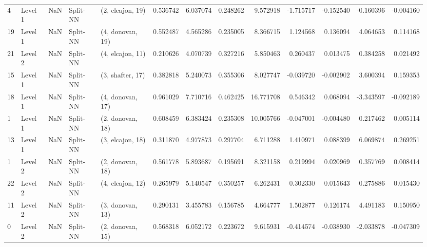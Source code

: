 \begin{tabular}{llrllrrrrrrrr}
4  &   Level 1 &    NaN &       Split-NN &  (2, elcajon, 19) &   0.536742 &   6.037074 &  0.248262 &   9.572918 &            -1.715717 &              -0.152540 &           -0.160396 &             -0.004160 \\
19 &   Level 1 &    NaN &       Split-NN &  (4, donovan, 19) &   0.552487 &   4.565286 &  0.235005 &   8.366715 &             1.124568 &               0.136094 &            4.064653 &              0.114168 \\
21 &   Level 2 &    NaN &       Split-NN &  (4, elcajon, 11) &   0.210626 &   4.070739 &  0.327216 &   5.850463 &             0.260437 &               0.013475 &            0.384258 &              0.021492 \\
15 &   Level 1 &    NaN &       Split-NN &  (3, shafter, 17) &   0.382818 &   5.240073 &  0.355306 &   8.027747 &            -0.039720 &              -0.002902 &            3.600394 &              0.159353 \\
18 &   Level 1 &    NaN &       Split-NN &  (4, donovan, 17) &   0.961029 &   7.710716 &  0.462425 &  16.771708 &             0.546342 &               0.068094 &           -3.343597 &             -0.092189 \\
1  &   Level 1 &    NaN &       Split-NN &  (2, donovan, 18) &   0.608459 &   6.383424 &  0.235308 &  10.005766 &            -0.047001 &              -0.004480 &            0.217462 &              0.005114 \\
13 &   Level 1 &    NaN &       Split-NN &  (3, elcajon, 18) &   0.311870 &   4.977873 &  0.297704 &   6.711288 &             1.410971 &               0.088399 &            6.069874 &              0.269251 \\
1  &   Level 2 &    NaN &       Split-NN &  (2, donovan, 18) &   0.561778 &   5.893687 &  0.195691 &   8.321158 &             0.219994 &               0.020969 &            0.357769 &              0.008414 \\
22 &   Level 2 &    NaN &       Split-NN &  (4, elcajon, 12) &   0.265979 &   5.140547 &  0.350257 &   6.262431 &             0.302330 &               0.015643 &            0.275886 &              0.015430 \\
11 &   Level 2 &    NaN &       Split-NN &  (3, donovan, 13) &   0.290131 &   3.455783 &  0.156785 &   4.664777 &             1.502877 &               0.126174 &            4.491183 &              0.150950 \\
0  &   Level 2 &    NaN &       Split-NN &  (2, donovan, 15) &   0.568318 &   6.052172 &  0.223672 &   9.615931 &            -0.414574 &              -0.038930 &           -2.033878 &             -0.047309 \\

\end{tabular}
